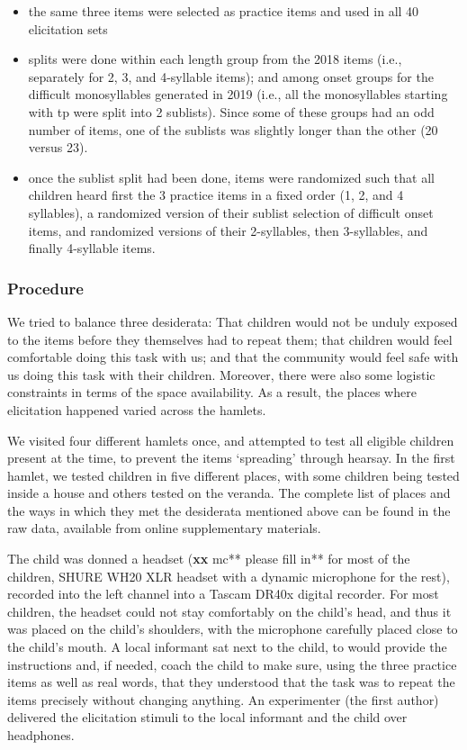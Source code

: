 \documentclass[english,,man,floatsintext]{apa6}
\providecommand{\tightlist}{%
  \setlength{\itemsep}{0pt}\setlength{\parskip}{0pt}}
\begin{document}
\begin{itemize}
\tightlist
\item
  the same three items were selected as practice items and used in all 40 elicitation sets
\item
  splits were done within each length group from the 2018 items (i.e., separately for 2, 3, and 4-syllable items); and among onset groups for the difficult monosyllables generated in 2019 (i.e., all the monosyllables starting with tp were split into 2 sublists). Since some of these groups had an odd number of items, one of the sublists was slightly longer than the other (20 versus 23).
\item
  once the sublist split had been done, items were randomized such that all children heard first the 3 practice items in a fixed order (1, 2, and 4 syllables), a randomized version of their sublist selection of difficult onset items, and randomized versions of their 2-syllables, then 3-syllables, and finally 4-syllable items.
\end{itemize}

\hypertarget{procedure}{%
\subsubsection{Procedure}\label{procedure}}

We tried to balance three desiderata: That children would not be unduly exposed to the items before they themselves had to repeat them; that children would feel comfortable doing this task with us; and that the community would feel safe with us doing this task with their children. Moreover, there were also some logistic constraints in terms of the space availability. As a result, the places where elicitation happened varied across the hamlets.

We visited four different hamlets once, and attempted to test all eligible children present at the time, to prevent the items `spreading' through hearsay. In the first hamlet, we tested children in five different places, with some children being tested inside a house and others tested on the veranda. The complete list of places and the ways in which they met the desiderata mentioned above can be found in the raw data, available from online supplementary materials.

The child was donned a headset (\textbf{xx }mc** please fill in** for most of the children, SHURE WH20 XLR headset with a dynamic microphone for the rest), recorded into the left channel into a Tascam DR40x digital recorder. For most children, the headset could not stay comfortably on the child's head, and thus it was placed on the child's shoulders, with the microphone carefully placed close to the child's mouth. A local informant sat next to the child, to would provide the instructions and, if needed, coach the child to make sure, using the three practice items as well as real words, that they understood that the task was to repeat the items precisely without changing anything. An experimenter (the first author) delivered the elicitation stimuli to the local informant and the child over headphones.
\end{document}
